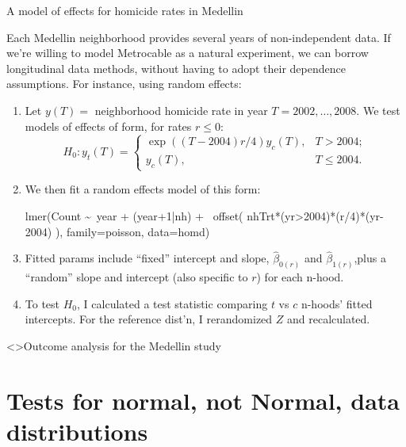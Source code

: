 \begin{frame}[fragile]{A model of effects for homicide rates in Medellin}

Each Medellin neighborhood provides several years of non-independent
data.  If we're willing to model Metrocable as a natural experiment,
we can borrow longitudinal data methods, without having to adopt their
dependence assumptions.   For instance, using random
 effects: 

 \begin{enumerate}[<+->]
 \item Let
   $y(T)=$ neighborhood homicide rate in year $T=2002, \ldots, 2008$.  We test models of
   effects of form, for rates $r \leq 0$:
$$H_{0}: y_{t}(T) = \left\{ \begin{array}{lr}\exp((T-2004) r/4)
                              y_{c}(T),& T> 2004; \\
y_{c}(T),& T\leq 2004.\end{array} \right.$$ 
 \item We then fit a random effects model of this form:
\begin{semiverbatim}
 lmer(Count \textasciitilde\  year + (year+1|nh) +\ \pause
            \alert<@+| handout:0>{offset}( nhTrt*(yr>2004)*(r/4)*(yr-2004) ),
          family=poisson, data=homd)
\end{semiverbatim}
\item Fitted params include  ``fixed'' intercept and slope,
  $\hat{\beta}_{0(r)}$ and $ \hat{\beta}_{1(r)}$,\pause  plus a
  ``random'' slope and intercept (also specific to $r$) for
  each n-hood.  
\item To test $H_{0}$, I calculated a test statistic comparing $t$ vs $c$
  n-hoods' fitted intercepts. For the reference dist'n, I rerandomized
  $Z$ and recalculated.
 \end{enumerate}

  
\end{frame}

\begin{frame}<\nottheirhandout>{Outcome analysis for the Medellin study}
  
  \begin{center}
  \end{center}

\end{frame}

\section{Tests for normal, not Normal, data distributions}


